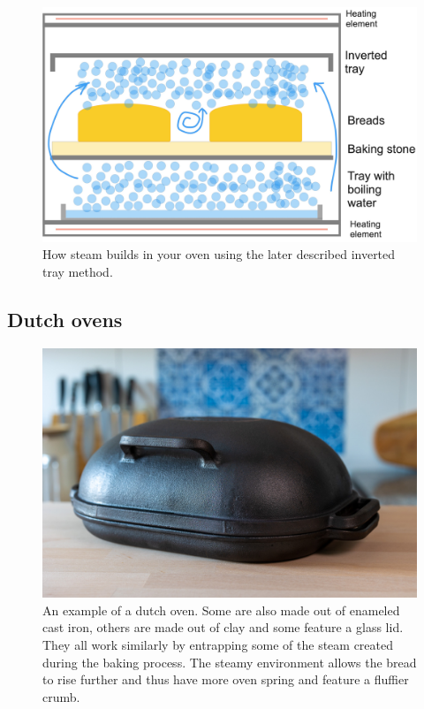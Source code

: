 \begin{figure}[!htb]
  \includegraphics[width=\textwidth]{baking-process-steam.jpg}
  \caption[Steam building with inverted tray]{How steam builds in your oven
      using the later described inverted tray method.}%
      \label{flc:inverted-tray}
\end{figure}

\subsection{Dutch ovens}

\begin{figure}[!htb]
  \includegraphics[width=\textwidth]{dutch-oven-example}
  \caption[Picture of dutch oven]{An example of a dutch oven. Some are also
      made out of enameled cast iron, others are made out of clay and some
      feature a glass lid.  They all work similarly by entrapping some of the
      steam created during the baking process. The steamy environment allows
      the bread to rise further and thus have more oven spring and feature a
      fluffier crumb.}%
\end{figure}

